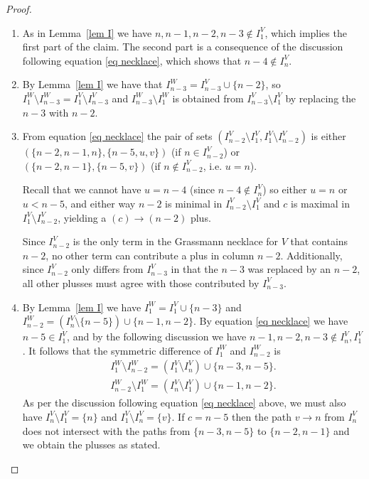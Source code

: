 \documentclass[11pt]{article}
\theoremstyle{remark}
\theoremstyle{definition}
\begin{document}
\begin{proof}
\begin{enumerate}  

\item As in Lemma~\ref{lem I} we have $n,n-1,n-2,n-3 \not\in I_1^V$, which implies the first part of the claim. The second part is a consequence of the discussion following equation \eqref{eq necklace}, which shows that $n-4 \not\in I_n^V$.

\item By Lemma~\ref{lem I} we have that $I_{n-3}^W = I_{n-3}^V \cup \{n-2\}$, so $I_{1}^W \setminus I_{n-3}^W = I_1^V \setminus I_{n-3}^V$ and $I_{n-3}^W \setminus I_1^W$ is obtained from $I_{n-3}^V \setminus I_{1}^V$ by replacing the $n-3$ with $n-2$.    

\item From equation \eqref{eq necklace} the pair of sets $(I_{n-2}^V\setminus I_1^V, I_1^V\setminus I_{n-2}^V)$ is either $(\{n-2, n-1, n\}, \{n-5, u, v\})$ (if $n \in I_{n-2}^V$) or $(\{n-2, n-1\}, \{n-5, v\})$ (if $n \not\in I_{n-2}^V$, i.e. $u = n$).

Recall that we cannot have $u = n-4$ (since $n-4 \notin I_n^V$) so either $u = n$ or $u < n-5$, and either way $n-2$ is minimal in $I_{n-2}^V\setminus I_1^V$ and $c$ is maximal in $I_1^V \setminus I_{n-2}^V$, yielding a $(c) \rightarrow (n-2)$ plus. 

Since $I_{n-2}^V$ is the only term in the Grassmann necklace for $V$ that contains $n-2$, no other term can contribute a plus in column $n-2$. Additionally, since $I_{n-2}^V$ only differs from $I_{n-3}^V$ in that the $n-3$ was replaced by an $n-2$, all other plusses must agree with those contributed by $I_{n-3}^V$. 

\item By Lemma~\ref{lem I} we have $I_1^W = I_1^V\cup \{n-3\}$ and $I_{n-2}^W = (I_n^V \setminus \{n-5\}) \cup \{n-1,n-2\}$. By equation \eqref{eq necklace} we have $n-5 \in I_1^V$, and by the following discussion we have $n-1,n-2,n-3 \not\in I_n^V,I_1^V$. It follows that the symmetric difference of $I_1^W$ and $I_{n-2}^W$ is
    \begin{gather*}
    I_1^W \setminus I_{n-2}^W  = (I_1^V\setminus I_n^V) \cup \{n-3, n-5\}. \\
    I_{n-2}^W \setminus I_1^W  = (I_n^V\setminus I_1^V) \cup \{n-1, n-2\}.
\end{gather*}
As per the discussion following equation \eqref{eq necklace} above, we must also have $I_n^V\setminus I_1^V = \{n\}$ and ${I_1^V\setminus I_n^V = \{v\}}$. If $c = n-5$ then the path $v \rightarrow n$ from $I_n^V$ does not intersect with the paths from $\{n-3, n-5\}$ to $\{n-2, n-1\}$ and we obtain the plusses as stated.
    

\end{enumerate}
\end{proof}
\end{document}
